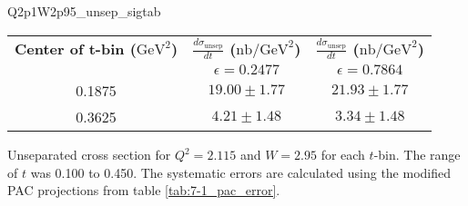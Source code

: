 \begin{Mtable}{Q2p1W2p95_unsep_sigtab}
  \centering
  \begin{tabular}{|c|c|c|}
    \hline
    \textbf{Center of t-bin ($\mathrm{GeV}^2$)} & \textbf{$\frac{d\sigma_{\mathrm{unsep}}}{dt}$ ($\mathrm{nb/GeV}^2$)} & \textbf{$\frac{d\sigma_{\mathrm{unsep}}}{dt}$ ($\mathrm{nb/GeV}^2$)} \\
    & $\epsilon=0.2477$ & $\epsilon=0.7864$ \\
    \hline
    0.1875 & $19.00\pm1.77$ & $21.93\pm1.77$\\
    0.3625 & $4.21\pm1.48$ & $3.34\pm1.48$\\
    \hline
  \end{tabular}
  \caption{Unseparated cross section for $Q^2=2.115$ and $W=2.95$ for each $t$-bin. The range of $t$ was 0.100 to 0.450. The systematic errors are calculated using the modified PAC projections from table \ref{tab:7-1_pac_error}.}
  \label{tab:Q2p1W2p95_unsep_sigtab}
\end{Mtable}

